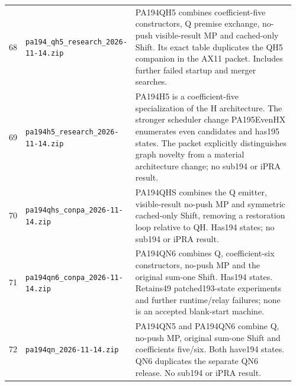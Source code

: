 \begin{longtable}{p{0.035\linewidth}p{0.31\linewidth}p{0.61\linewidth}}
68 & \nolinkurl{pa194_qh5_research_2026-11-14.zip} & PA194QH5 combines coefficient-five constructors, Q premise exchange, no-push visible-result MP and cached-only Shift. Its exact table duplicates the QH5 companion in the AX11 packet. Includes further failed startup and merger searches.\\[4pt]
69 & \nolinkurl{pa194h5_research_2026-11-14.zip} & PA194H5 is a coefficient-five specialization of the H architecture. The stronger scheduler change PA195EvenHX enumerates even candidates and has195 states. The packet explicitly distinguishes graph novelty from a material architecture change; no sub194 or iPRA result.\\[4pt]
70 & \nolinkurl{pa194qhs_conpa_2026-11-14.zip} & PA194QHS combines the Q emitter, visible-result no-push MP and symmetric cached-only Shift, removing a restoration loop relative to QH. Has194 states; no sub194 or iPRA result.\\[4pt]
71 & \nolinkurl{pa194qn6_conpa_2026-11-14.zip} & PA194QN6 combines Q, coefficient-six constructors, no-push MP and the original sum-one Shift. Has194 states. Retains49 patched193-state experiments and further runtime/relay failures; none is an accepted blank-start machine.\\[4pt]
72 & \nolinkurl{pa194qn_2026-11-14.zip} & PA194QN5 and PA194QN6 combine Q, no-push MP, original sum-one Shift and coefficients five/six. Both have194 states. QN6 duplicates the separate QN6 release. No sub194 or iPRA result.\\[4pt]
\bottomrule
\end{longtable}
\endgroup
